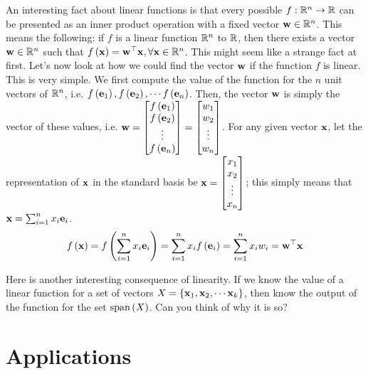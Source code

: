 An interesting fact about linear functions is that every possible $f: \mathbb{R}^n \to \mathbb{R}$ can be presented as an inner product operation with a fixed vector $\mathbf{w} \in \mathbb{R}^n$. This means the following: if $f$ is a linear function $\mathbb{R}^n$ to $\mathbb{R}$, then there exists a vector $\mathbf{w} \in \mathbb{R}^n$ such that $f\left( \mathbf{x}\right) = \mathbf{w}^\top\mathbf{x}, \forall \mathbf{x} \in \mathbb{R}^n$. This might seem like a strange fact at first. Let's now look at how we could find the vector $\mathbf{w}$ if the function $f$ is linear. This is very simple. We first compute the value of the function for the $n$ unit vectors of $\mathbb{R}^n$, i.e. $f\left( \mathbf{e}_1\right), f\left( \mathbf{e}_2\right), \cdots f\left( \mathbf{e}_n\right)$. Then, the vector $\mathbf{w}$ is simply the vector of these values, i.e. $\mf{w} = \bmxc f\pp{\mf{e}_1} \\ f\pp{\mf{e}_2} \\ \vdots \\ f\pp{\mf{e}_n} \emx = \bmxc w_1 \\ w_2 \\ \vdots \\ w_n \emx$. For any given vector $\mathbf{x}$, let the representation of $\mathbf{x}$ in the standard basis be $\mf{x} = \bmxc x_1 \\x_2 \\ \vdots \\ x_n\emx$; this simply means that $\mathbf{x} = \sum_{i=1}^n x_i\mathbf{e}_i$.
\[ 
\begin{split}
    f\left( \mathbf{x}\right) = f\left( \sum_{i=1}^nx_i\mathbf{e}_i\right) = \sum_{i=1}^nx_if\left( \mathbf{e}_i\right) = \sum_{i=1}^nx_iw_i = \mathbf{w}^\top\mathbf{x}
\end{split}
\]

Here is another interesting consequence of linearity. If we know the value of a linear function for a set of vectors $X = \left\{ \mathbf{x}_1, \mathbf{x}_2, \cdots \mathbf{x}_k \right\}$, then know the output of the function for the set $\text{span}\left( X\right)$. Can you think of why it is so?

\section{Applications}

